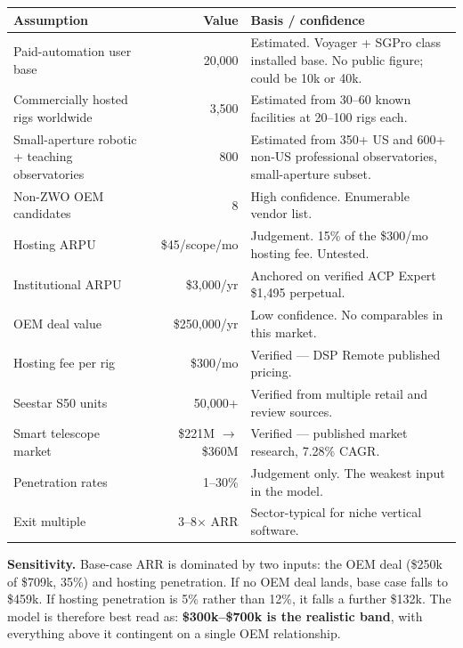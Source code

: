 \documentclass[11pt]{article}
\newcommand{\dollar}[1]{\$#1}
\begin{document}
\begin{center}
\small
\begin{longtable}{@{}p{4.4cm}rp{7.6cm}@{}}
\toprule
\textbf{Assumption} & \textbf{Value} & \textbf{Basis / confidence} \\
\midrule
\endhead
Paid-automation user base & 20{,}000 & \textcolor{acamber}{Estimated.} Voyager + SGPro class installed base. No public figure; could be 10k or 40k. \\
Commercially hosted rigs worldwide & 3{,}500 & \textcolor{acamber}{Estimated} from 30--60 known facilities at 20--100 rigs each. \\
Small-aperture robotic + teaching observatories & 800 & \textcolor{acamber}{Estimated} from 350+ US and 600+ non-US professional observatories, small-aperture subset. \\
Non-ZWO OEM candidates & 8 & \textcolor{acgreen}{High confidence.} Enumerable vendor list. \\
Hosting ARPU & \dollar{45}/scope/mo & \textcolor{acamber}{Judgement.} 15\% of the \dollar{300}/mo hosting fee. Untested. \\
Institutional ARPU & \dollar{3{,}000}/yr & \textcolor{acgreen}{Anchored} on verified ACP Expert \dollar{1{,}495} perpetual. \\
OEM deal value & \dollar{250{,}000}/yr & \textcolor{acred}{Low confidence.} No comparables in this market. \\
Hosting fee per rig & \dollar{300}/mo & \textcolor{acgreen}{Verified} --- DSP Remote published pricing. \\
Seestar S50 units & 50{,}000+ & \textcolor{acgreen}{Verified} from multiple retail and review sources. \\
Smart telescope market & \dollar{221}M $\rightarrow$ \dollar{360}M & \textcolor{acgreen}{Verified} --- published market research, 7.28\% CAGR. \\
Penetration rates & 1--30\% & \textcolor{acred}{Judgement only.} The weakest input in the model. \\
Exit multiple & 3--8$\times$ ARR & \textcolor{acamber}{Sector-typical} for niche vertical software. \\
\bottomrule
\end{longtable}
\end{center}

\begin{warnbox}
\textbf{Sensitivity.} Base-case ARR is dominated by two inputs: the OEM deal
(\dollar{250}k of \dollar{709}k, 35\%) and hosting penetration. If no OEM deal
lands, base case falls to \dollar{459}k. If hosting penetration is 5\% rather
than 12\%, it falls a further \dollar{132}k. The model is therefore best read as:
\textbf{\dollar{300}k--\dollar{700}k is the realistic band}, with everything above
it contingent on a single OEM relationship.
\end{warnbox}
\end{document}
